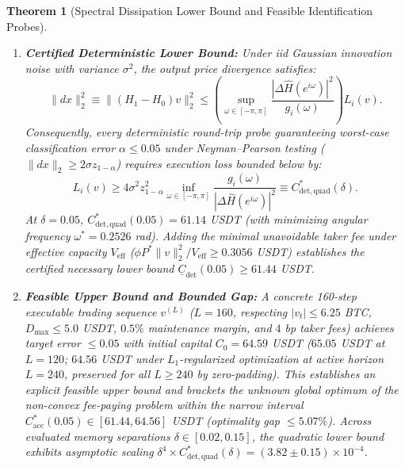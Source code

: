 \documentclass[12pt]{article}
\newtheorem{theorem}{Theorem}[section]
\theoremstyle{definition}
\theoremstyle{remark}
\begin{document}
\begin{theorem}[Spectral Dissipation Lower Bound and Feasible Identification Probes]
\begin{enumerate}
\begin{equation}
\end{equation}
where $V(e^{i\omega}) = \sum_{t=0}^L v_t e^{-i\omega t}$.
\item \textbf{Certified Deterministic Lower Bound:} Under iid Gaussian innovation noise with variance $\sigma^2$, the output price divergence satisfies:
\begin{equation}
\|dx\|_2^2 \equiv \|(H_1 - H_0) v\|_2^2 \le \left( \sup_{\omega \in [-\pi, \pi]} \frac{|\Delta \widehat{H}(e^{i\omega})|^2}{g_i(\omega)} \right) L_i(v).
\end{equation}
Consequently, every deterministic round-trip probe guaranteeing worst-case classification error $\alpha \le 0.05$ under Neyman--Pearson testing ($\|dx\|_2 \ge 2\sigma z_{1-\alpha}$) requires execution loss bounded below by:
\begin{equation}
L_i(v) \ge 4 \sigma^2 z_{1-\alpha}^2 \inf_{\omega \in [-\pi, \pi]} \frac{g_i(\omega)}{|\Delta \widehat{H}(e^{i\omega})|^2} \equiv C^*_{\mathrm{det,quad}}(\delta).
\end{equation}
At $\delta = 0.05$, $C^*_{\mathrm{det,quad}}(0.05) = 61.14$ USDT (with minimizing angular frequency $\omega^* = 0.2526$ rad). Adding the minimal unavoidable taker fee under effective capacity $V_{\mathrm{eff}}$ ($\phi P^* \|v\|_2^2 / V_{\mathrm{eff}} \ge 0.3056$ USDT) establishes the certified necessary lower bound $\underline{C}_{\mathrm{det}}(0.05) \ge 61.44$ USDT.
\item \textbf{Feasible Upper Bound and Bounded Gap:} A concrete 160-step executable trading sequence $v^{(L)}$ ($L=160$, respecting $|v_t| \le 6.25$ BTC, $D_{\max} \le 5.0$ USDT, $0.5\%$ maintenance margin, and $4$ bp taker fees) achieves target error $\le 0.05$ with initial capital $C_0 = 64.59$ USDT ($65.05$ USDT at $L=120$; $64.56$ USDT under $L_1$-regularized optimization at active horizon $L=240$, preserved for all $L \ge 240$ by zero-padding). This establishes an explicit feasible upper bound and brackets the unknown global optimum of the non-convex fee-paying problem within the narrow interval $C^*_{\mathrm{acc}}(0.05) \in [61.44, 64.56]$ USDT (optimality gap $\le 5.07\%$). Across evaluated memory separations $\delta \in [0.02, 0.15]$, the quadratic lower bound exhibits asymptotic scaling $\delta^4 \times C^*_{\mathrm{det,quad}}(\delta) = (3.82 \pm 0.15) \times 10^{-4}$.
\end{enumerate}
\end{theorem}
\end{document}
